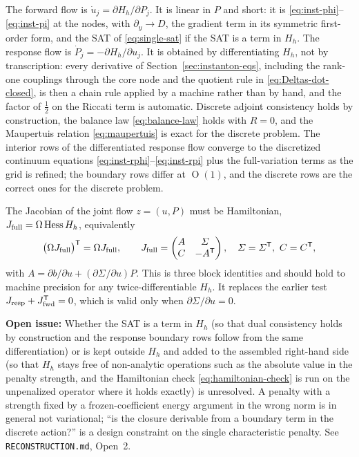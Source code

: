 \documentclass[a4paper,11pt]{article}
\newcommand{\semibold}[1]{{\fontseries{b}\selectfont{#1}}}
\newcommand{\para}[1]{\par\vspace{2mm}\noindent\semibold{{#1.}---}\ignorespaces}
\DeclareMathOperator{\Or}{O}
\newcommand{\transpose}{\mathsf{T}}
\newenvironment{todo}{\begin{tcolorbox}[enhanced,breakable,colback=SussexBurntOrange!10,colframe=SussexBurntOrange!40]\small{\textsf{\textbf{Open issue:} }}}{\end{tcolorbox}}
\newcommand{\yco}{y}                         %
\newcommand{\Sigvol}[1]{\varSigma_{#1}}      %
\newcommand{\Hh}{H_h}                         %
\begin{document}
The forward flow is $\dot u_j=\partial\Hh/\partial P_j$. It is linear in
$P$ and short: it is \eqref{eq:inst-phi}--\eqref{eq:inst-pi} at the
nodes, with $\partial_\yco\to D$, the gradient term in its symmetric
first-order form, and the SAT of \eqref{eq:single-sat} if the SAT is a
term in $\Hh$. The response flow is $\dot P_j=-\partial\Hh/\partial u_j$.
It is obtained by differentiating $\Hh$, not by transcription: every
derivative of Section~\ref{sec:instanton-eqs}, including the rank-one
couplings through the core node and the quotient rule in
\eqref{eq:Deltas-dot-closed}, is then a chain rule applied by a machine
rather than by hand, and the factor of $\tfrac12$ on the Riccati term is
automatic. Discrete adjoint consistency holds by construction, the
balance law \eqref{eq:balance-law} holds with $R=0$, and the Maupertuis
relation \eqref{eq:maupertuis} is exact for the discrete problem. The
interior rows of the differentiated response flow converge to the
discretized continuum equations \eqref{eq:inst-rphi}--\eqref{eq:inst-rpi}
plus the full-variation terms as the grid is refined; the boundary rows
differ at $\Or(1)$, and the discrete rows are the correct ones for the
discrete problem.

\para{Acceptance test} The Jacobian of the joint flow $z=(u,P)$ must be
Hamiltonian, $J_{\rm full}=\Omega\,\mathrm{Hess}\,\Hh$, equivalently
\begin{equation}
    \big(\Omega J_{\rm full}\big)^{\transpose} = \Omega J_{\rm full} ,
    \qquad
    J_{\rm full} = \begin{pmatrix} A & \Sigvol{} \\ C & -A^{\transpose} \end{pmatrix} ,
    \quad \Sigvol{}=\Sigvol{}^{\transpose} , \ C=C^{\transpose} ,
    \label{eq:hamiltonian-check}
\end{equation}
with $A=\partial b/\partial u+(\partial\Sigvol{}/\partial u)P$. This is
three block identities and should hold to machine precision for any
twice-differentiable $\Hh$. It replaces the earlier test
$J_{\rm resp}+J_{\rm fwd}^{\transpose}=0$, which is valid only when
$\partial\Sigvol{}/\partial u=0$.

\begin{todo}
Whether the SAT is a term in $\Hh$ (so that dual consistency holds by
construction and the response boundary rows follow from the same
differentiation) or is kept outside $\Hh$ and added to the assembled
right-hand side (so that $\Hh$ stays free of non-analytic operations such
as the absolute value in the penalty strength, and the Hamiltonian check
\eqref{eq:hamiltonian-check} is run on the unpenalized operator where it
holds exactly) is unresolved. A penalty with a strength fixed by a
frozen-coefficient energy argument in the wrong norm is in general not
variational; ``is the closure derivable from a boundary term in the
discrete action?'' is a design constraint on the single characteristic
penalty. See \texttt{RECONSTRUCTION.md}, Open~2.
\end{todo}
\end{document}
